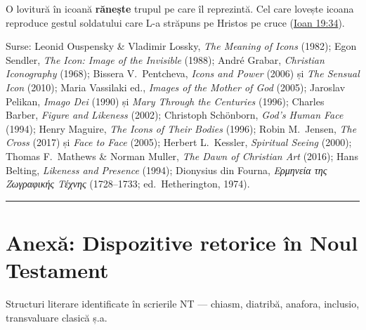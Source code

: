 \documentclass[12pt,a4paper,twoside,openany]{book}
\begin{document}
O lovitură în icoană \textbf{rănește} trupul pe care îl reprezintă. Cel care lovește icoana reproduce gestul soldatului care L-a străpuns pe Hristos pe cruce (\href{https://bibliaortodoxa.ro/carte.php?id=35\&cap=19\#34}{Ioan 19:34}).

\vspace{10pt}
\noindent\small Surse: Leonid Ouspensky \& Vladimir Lossky, \textit{The Meaning of Icons} (1982); Egon Sendler, \textit{The Icon: Image of the Invisible} (1988); André Grabar, \textit{Christian Iconography} (1968); Bissera V.\ Pentcheva, \textit{Icons and Power} (2006) și \textit{The Sensual Icon} (2010); Maria Vassilaki ed., \textit{Images of the Mother of God} (2005); Jaroslav Pelikan, \textit{Imago Dei} (1990) și \textit{Mary Through the Centuries} (1996); Charles Barber, \textit{Figure and Likeness} (2002); Christoph Schönborn, \textit{God's Human Face} (1994); Henry Maguire, \textit{The Icons of Their Bodies} (1996); Robin M.\ Jensen, \textit{The Cross} (2017) și \textit{Face to Face} (2005); Herbert L.\ Kessler, \textit{Spiritual Seeing} (2000); Thomas F.\ Mathews \& Norman Muller, \textit{The Dawn of Christian Art} (2016); Hans Belting, \textit{Likeness and Presence} (1994); Dionysius din Fourna, \textit{Ερμηνεία της Ζωγραφικής Τέχνης} (1728--1733; ed.\ Hetherington, 1974).
\normalsize

\bigskip\noindent\textcolor{darkred}{\rule{\textwidth}{2pt}}\bigskip

\chapter{Anexă: Dispozitive retorice în Noul Testament}\label{retorica}

Structuri literare identificate în scrierile NT --- chiasm, diatribă, anafora, inclusio, transvaluare clasică ș.a.
\end{document}
